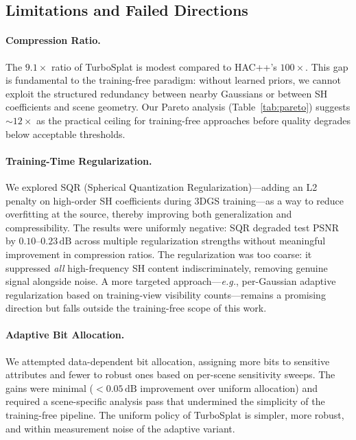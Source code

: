 \documentclass[sigconf,review]{acmart}
\newcommand{\ours}{TurboSplat}
\newcommand{\eg}{\textit{e.g.}}
\newcommand{\dB}{\,\text{dB}}
\begin{document}
\subsection{Limitations and Failed Directions}
\label{sec:limitations}

\paragraph{Compression Ratio.}
The $9.1{\times}$ ratio of \ours{} is modest compared to HAC++'s $100{\times}$.
This gap is fundamental to the training-free paradigm: without learned priors, we cannot exploit the structured redundancy between nearby Gaussians or between SH coefficients and scene geometry.
Our Pareto analysis (Table~\ref{tab:pareto}) suggests ${\sim}12{\times}$ as the practical ceiling for training-free approaches before quality degrades below acceptable thresholds.

\paragraph{Training-Time Regularization.}
We explored SQR (Spherical Quantization Regularization)---adding an L2 penalty on high-order SH coefficients during 3DGS training---as a way to reduce overfitting at the source, thereby improving both generalization and compressibility.
The results were uniformly negative: SQR degraded test PSNR by $0.10$--$0.23\dB$ across multiple regularization strengths without meaningful improvement in compression ratios.
The regularization was too coarse: it suppressed \emph{all} high-frequency SH content indiscriminately, removing genuine signal alongside noise.
A more targeted approach---\eg{}, per-Gaussian adaptive regularization based on training-view visibility counts---remains a promising direction but falls outside the training-free scope of this work.

\paragraph{Adaptive Bit Allocation.}
We attempted data-dependent bit allocation, assigning more bits to sensitive attributes and fewer to robust ones based on per-scene sensitivity sweeps.
The gains were minimal ($<0.05\dB$ improvement over uniform allocation) and required a scene-specific analysis pass that undermined the simplicity of the training-free pipeline.
The uniform policy of \ours{} is simpler, more robust, and within measurement noise of the adaptive variant.
\end{document}
